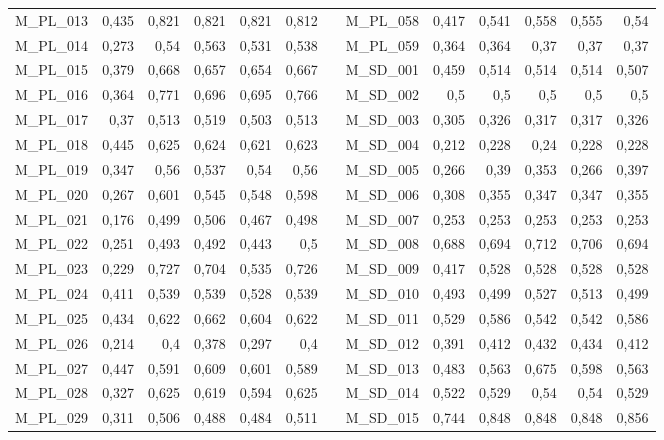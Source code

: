 \begin{table}[hp]
\begin{adjustbox}{angle=90}
\begin{tabular}{lrrrrrrrrrrrr}
    M\_PL\_013 & 0,435 & 0,821 & 0,821 & 0,821 & 0,812 &      & M\_PL\_058 & 0,417 & 0,541 & 0,558 & 0,555 & 0,54 \\
    M\_PL\_014 & 0,273 & 0,54 & 0,563 & 0,531 & 0,538 &      & M\_PL\_059 & 0,364 & 0,364 & 0,37 & 0,37 & 0,37 \\
    M\_PL\_015 & 0,379 & 0,668 & 0,657 & 0,654 & 0,667 &      & M\_SD\_001 & 0,459 & 0,514 & 0,514 & 0,514 & 0,507 \\
    M\_PL\_016 & 0,364 & 0,771 & 0,696 & 0,695 & 0,766 &      & M\_SD\_002 & 0,5  & 0,5  & 0,5  & 0,5  & 0,5 \\
    M\_PL\_017 & 0,37 & 0,513 & 0,519 & 0,503 & 0,513 &      & M\_SD\_003 & 0,305 & 0,326 & 0,317 & 0,317 & 0,326 \\
    M\_PL\_018 & 0,445 & 0,625 & 0,624 & 0,621 & 0,623 &      & M\_SD\_004 & 0,212 & 0,228 & 0,24 & 0,228 & 0,228 \\
    M\_PL\_019 & 0,347 & 0,56 & 0,537 & 0,54 & 0,56 &      & M\_SD\_005 & 0,266 & 0,39 & 0,353 & 0,266 & 0,397 \\
    M\_PL\_020 & 0,267 & 0,601 & 0,545 & 0,548 & 0,598 &      & M\_SD\_006 & 0,308 & 0,355 & 0,347 & 0,347 & 0,355 \\
    M\_PL\_021 & 0,176 & 0,499 & 0,506 & 0,467 & 0,498 &      & M\_SD\_007 & 0,253 & 0,253 & 0,253 & 0,253 & 0,253 \\
    M\_PL\_022 & 0,251 & 0,493 & 0,492 & 0,443 & 0,5  &      & M\_SD\_008 & 0,688 & 0,694 & 0,712 & 0,706 & 0,694 \\
    M\_PL\_023 & 0,229 & 0,727 & 0,704 & 0,535 & 0,726 &      & M\_SD\_009 & 0,417 & 0,528 & 0,528 & 0,528 & 0,528 \\
    M\_PL\_024 & 0,411 & 0,539 & 0,539 & 0,528 & 0,539 &      & M\_SD\_010 & 0,493 & 0,499 & 0,527 & 0,513 & 0,499 \\
    M\_PL\_025 & 0,434 & 0,622 & 0,662 & 0,604 & 0,622 &      & M\_SD\_011 & 0,529 & 0,586 & 0,542 & 0,542 & 0,586 \\
    M\_PL\_026 & 0,214 & 0,4  & 0,378 & 0,297 & 0,4  &      & M\_SD\_012 & 0,391 & 0,412 & 0,432 & 0,434 & 0,412 \\
    M\_PL\_027 & 0,447 & 0,591 & 0,609 & 0,601 & 0,589 &      & M\_SD\_013 & 0,483 & 0,563 & 0,675 & 0,598 & 0,563 \\
    M\_PL\_028 & 0,327 & 0,625 & 0,619 & 0,594 & 0,625 &      & M\_SD\_014 & 0,522 & 0,529 & 0,54 & 0,54 & 0,529 \\
    M\_PL\_029 & 0,311 & 0,506 & 0,488 & 0,484 & 0,511 &      & M\_SD\_015 & 0,744 & 0,848 & 0,848 & 0,848 & 0,856 \\

\end{tabular}
\end{adjustbox}
\end{table}
